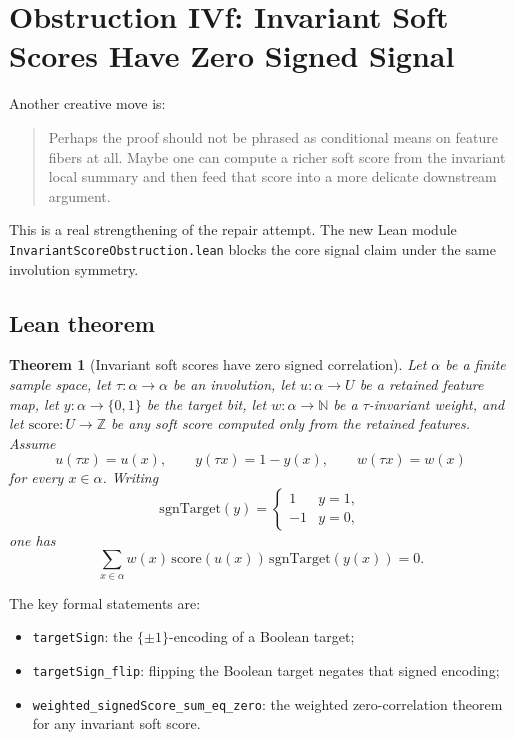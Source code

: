 \documentclass[11pt]{article}
\newtheorem{theorem}{Theorem}[section]
\theoremstyle{remark}
\begin{document}
\section{Obstruction IVf: Invariant Soft Scores Have Zero Signed Signal}

Another creative move is:
\begin{quote}
Perhaps the proof should not be phrased as conditional means on feature fibers at all.  Maybe one
can compute a richer soft score from the invariant local summary and then feed that score into a
more delicate downstream argument.
\end{quote}

This is a real strengthening of the repair attempt.  The new Lean module
\texttt{InvariantScoreObstruction.lean} blocks the core signal claim under the same involution
symmetry.

\subsection{Lean theorem}

\begin{theorem}[Invariant soft scores have zero signed correlation]
Let \(\alpha\) be a finite sample space, let \(\tau : \alpha \to \alpha\) be an involution, let
\(u : \alpha \to U\) be a retained feature map, let \(y : \alpha \to \{0,1\}\) be the target bit,
let \(w : \alpha \to \mathbb{N}\) be a \(\tau\)-invariant weight, and let
\(\mathrm{score} : U \to \mathbb{Z}\) be any soft score computed only from the retained features.
Assume
\[
  u(\tau x) = u(x), \qquad y(\tau x) = 1-y(x), \qquad w(\tau x) = w(x)
\]
for every \(x \in \alpha\).  Writing
\[
  \mathrm{sgnTarget}(y) =
  \begin{cases}
    1 & y=1, \\
    -1 & y=0,
  \end{cases}
\]
one has
\[
  \sum_{x \in \alpha} w(x)\,\mathrm{score}(u(x))\,\mathrm{sgnTarget}(y(x)) = 0.
\]
\end{theorem}

\noindent
The key formal statements are:
\begin{itemize}[leftmargin=1.5em]
  \item \texttt{targetSign}: the \(\{\pm 1\}\)-encoding of a Boolean target;
  \item \texttt{targetSign\_flip}: flipping the Boolean target negates that signed encoding;
  \item \texttt{weighted\_signedScore\_sum\_eq\_zero}: the weighted zero-correlation theorem for
  any invariant soft score.
\end{itemize}
\end{document}
